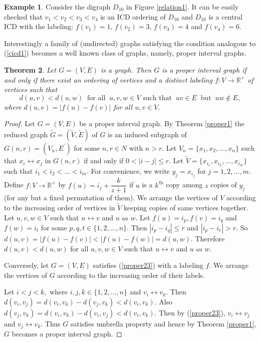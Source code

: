 \documentclass{article}
\newtheorem{thm}{Theorem}[section]
\theoremstyle{definition}
\newtheorem{exmp}[thm]{Example}
\numberwithin{equation}{section}
\newcommand{\Real}{\mathbb{R}}
\begin{document}
\begin{exmp}
Consider the digraph $D_{10}$ in Figure \ref{relation1}. It can be easily checked that $v_1<v_2<v_3<v_4$ is an ICD ordering of $D_{10}$ and $D_{10}$ is a central ICD with the labeling: $f(v_1)=1$, $f(v_2)=3$, $f(v_3)=4$ and $f(v_4)=6$.
\end{exmp}

\noindent 
Interestingly a family of (undirected) graphs satisfying the condition analogous to (\ref{cicd1}) becomes a well known class of graphs, namely, proper interval graphs.

\begin{thm}
Let $G=(V,E)$ is a graph. Then $G$ is a proper interval graph if and only if there exist an ordering of vertices and a distinct labeling $f:V\rightarrow \mathbb{R}^+$ of vertices such that
\begin{equation}\label{proper23}
 d(u,v)<d(u,w)\ \text{ for all }\ u,v,w\in V \text{ such that }\ uv\in E\ \text{ but }\ uw\notin E,
 \end{equation}
where $d(u,v)=|f(u)-f(v)|$ for all $u,v\in V$.
\end{thm}

\begin{proof}
Let $G=(V,E)$ be a proper interval graph. By Theorem \ref{proper1} the reduced graph $\tilde{G}=(\tilde{V},\tilde{E})$ of $G$ is an induced subgraph of $G(n,r)=(V_{n},E^{'})$ for some $n,r\in N$ with $n>r$. Let $V_{n}=\{x_{1},x_{2},\hdots,x_{n}\}$ such that $x_{i} \leftrightarrow x_{j}$ in $G(n,r)$ if and only if $0<|i-j|\leq r$. Let $\tilde{V}=\{x_{i_{1}},x_{i_{2}},\hdots,x_{i_{m}}\}$ such that $i_{1}<i_{2}<\hdots<i_{m}$. For convenience, we write $y_{j}=x_{i_{j}}$ for $j=1,2,\hdots,m$. Define $f: V\rightarrow \Real^+$ by $f(u)=i_{j}+\dfrac{k}{z+1}$ if $u$ is a  $k^{\text{th}}$ copy among $z$ copies of $y_{j}$ (for any but a fixed permutation of them). We arrange the vertices of $V$ according to the increasing order of vertices in $\tilde{V}$ keeping copies of same vertices together.
Let $u,v,w\in V$ such that $u\leftrightarrow v$ and $u\nleftrightarrow w$.
Let $f(u)=i_{p},f(v)=i_{q}$ and $f(w)=i_{t}$ for some $p,q,t\in\{1,2,\hdots,n\}$. Then
$|i_{p}-i_{q}|\leq r$ and $|i_{p}-i_{r}|>r$. So $d(u,v)=|f(u)-f(v)|<|f(u)-f(w)|=d(u,w)$. Therefore $d(u,v)<d(u,w)$ for all $u,v,w\in V$ such that $u\leftrightarrow v$ and $u\nleftrightarrow w$. 

\vspace{.1cm}
\noindent Conversely, let $G=(V,E)$ satisfies (\ref{proper23}) with a labeling $f$. We arrange the vertices of $G$ according to the increasing order of their labels.

\noindent Let $i<j<k,$ where $i,j,k\in \{1,2,\hdots,n\}$ and $v_{i}\leftrightarrow v_{k}$. Then $d(v_{i},v_{j})=d(v_{i},v_{k})-d(v_{j},v_{k})<d(v_{i},v_{k})$.
Also $d(v_{j},v_{k})=d(v_{i},v_{k})-d(v_{i},v_{j})<d(v_{i},v_{k})$. Then by (\ref{proper23}), $v_{i}\leftrightarrow v_{j}$ and $v_{j}\leftrightarrow v_{k}$. 
Thus $G$ satisfies umbrella property and hence by Theorem \ref{proper1}, $G$ becomes a proper interval graph.
\end{proof}
\end{document}
